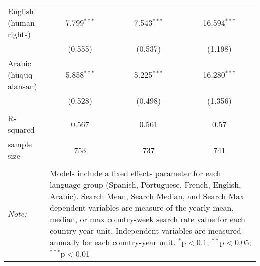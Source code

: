 \begin{table}[!htbp]
\begin{tabular}{@{\extracolsep{5pt}}lccc}
  English (human rights) & 7.799$^{***}$ & 7.543$^{***}$ & 16.594$^{***}$ \\ 
  & (0.555) & (0.537) & (1.198) \\ 
  Arabic (huquq alansan) & 5.858$^{***}$ & 5.225$^{***}$ & 16.280$^{***}$ \\ 
  & (0.528) & (0.498) & (1.356) \\ 
 \hline \\[-1.8ex] 
R-squared  & 0.567 & 0.561 & 0.57 \\ 
sample size  & 753 & 737 & 741 \\ 
\hline 
\hline \\[-1.8ex] 
\textit{Note:}  & \multicolumn{3}{l}{\parbox[t]{8cm}{Models include a fixed effects parameter for each language group (Spanish, Portuguese, French, English, Arabic). Search Mean, Search Median, and Search Max dependent variables are measure of the yearly mean, median, or max country-week search rate value for each country-year unit. Independent variables are measured annually for each country-year unit. $^{*}$p$<$0.1; $^{**}$p$<$0.05; $^{***}$p$<$0.01}} \\ 
\end{tabular} 
\end{table} 
